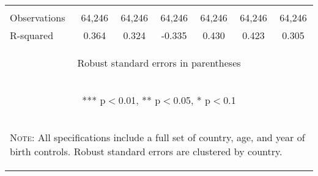 \documentclass{article}[11pt,subeqn]
\begin{document}
\begin{spacing}{1.25}
\begin{sidewaystable}[!htbp]
\begin{center}
\begin{tabular}{lcccccc}
\vspace{4pt}	&	\begin{footnotesize}\end{footnotesize}	&	\begin{footnotesize}\end{footnotesize}	&	\begin{footnotesize}\end{footnotesize}	&	\begin{footnotesize}\end{footnotesize}	&	\begin{footnotesize}\end{footnotesize}	&	\begin{footnotesize}\end{footnotesize}	\\
Observations	&	64,246	&	64,246	&	64,246	&	64,246	&	64,246	&	64,246	\\
R-squared	&	0.364	&	0.324	&	-0.335	&	0.430	&	0.423	&	0.305	\\  \midrule
\multicolumn{7}{c}{\begin{footnotesize} Robust standard errors in parentheses\end{footnotesize}} \\													
\multicolumn{7}{c}{\begin{footnotesize} *** p$<$0.01, ** p$<$0.05, * p$<$0.1\end{footnotesize}} \\													
\bottomrule													
\multicolumn{7}{p{12.2cm}}{\setstretch{0.9}\begin{footnotesize}\textsc{Note:} All specifications include a full set of country, age, and year of birth controls. Robust standard errors are clustered by country.													
\end{footnotesize}}\\													
\end{tabular}													
\end{center}													
\end{sidewaystable}													


\end{spacing}
\end{document}
